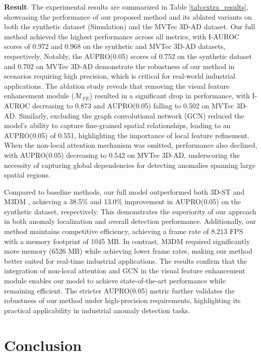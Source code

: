 \textbf{Result}. The experimental results are summarized in Table \ref{tab:extra_results}, showcasing the performance of our proposed method and its ablated variants on both the synthetic dataset (Simulation) and the MVTec 3D-AD dataset. Our full method achieved the highest performance across all metrics, with I-AUROC scores of 0.972 and 0.968 on the synthetic and MVTec 3D-AD datasets, respectively. Notably, the AUPRO(0.05) scores of 0.752 on the synthetic dataset and 0.702 on MVTec 3D-AD demonstrate the robustness of our method in scenarios requiring high precision, which is critical for real-world industrial applications. The ablation study reveals that removing the visual feature enhancement module ($\mathcal{M}_{FE}$) resulted in a significant drop in performance, with I-AUROC decreasing to 0.873 and AUPRO(0.05) falling to 0.502 on MVTec 3D-AD. Similarly, excluding the graph convolutional network (GCN) reduced the model's ability to capture fine-grained spatial relationships, leading to an AUPRO(0.05) of 0.551, highlighting the importance of local feature refinement. When the non-local attention mechanism was omitted, performance also declined, with AUPRO(0.05) decreasing to 0.542 on MVTec 3D-AD, underscoring the necessity of capturing global dependencies for detecting anomalies spanning large spatial regions.

Compared to baseline methods, our full model outperformed both 3D-ST \cite{bergmann2023anomaly} and M3DM \cite{wang2023multimodal}, achieving a 38.5\% and 13.0\% improvement in AUPRO(0.05) on the synthetic dataset, respectively. This demonstrates the superiority of our approach in both anomaly localization and overall detection performance. Additionally, our method maintains competitive efficiency, achieving a frame rate of 8.213 FPS with a memory footprint of 1045 MB. In contrast, M3DM required significantly more memory (6526 MB) while achieving lower frame rates, making our method better suited for real-time industrial applications. The results confirm that the integration of non-local attention and GCN in the visual feature enhancement module enables our model to achieve state-of-the-art performance while remaining efficient. The stricter AUPRO(0.05) metric further validates the robustness of our method under high-precision requirements, highlighting its practical applicability in industrial anomaly detection tasks.

\section*{Conclusion}
\label{sec:Conclusion}


